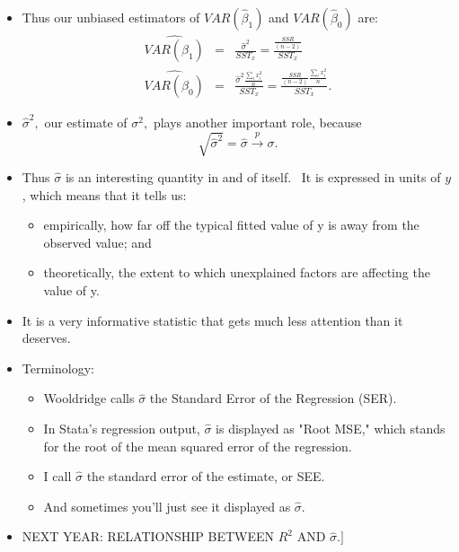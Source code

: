 \documentclass[11pt]{article}
\begin{document}
\begin{itemize}
\item Thus our unbiased estimators of $VAR\left( \widehat{\beta }_{1}\right) 
$ and $VAR\left( \widehat{\beta }_{0}\right) $ are:%
\begin{eqnarray*}
\widehat{VAR\left( \widehat{\beta }_{1}\right) } &=&\frac{\widehat{\sigma }%
^{2}}{SST_{x}}=\frac{\frac{SSR}{\left( n-2\right) }}{SST_{x}} \\
\widehat{VAR\left( \widehat{\beta }_{0}\right) } &=&\frac{\widehat{\sigma }%
^{2}\frac{\sum\nolimits_{i}x_{i}^{2}}{n}}{SST_{x}}=\frac{\frac{SSR}{\left(
n-2\right) }\frac{\sum\nolimits_{i}x_{i}^{2}}{n}}{SST_{x}}.
\end{eqnarray*}

\item $\widehat{\sigma }^{2},$ our estimate of $\sigma ^{2},$ plays another
important role, because 
\begin{equation*}
\sqrt{\widehat{\sigma }^{2}}=\widehat{\sigma }\overset{p}{\rightarrow }%
\sigma .
\end{equation*}

\item Thus $\widehat{\sigma }$ is an interesting quantity in and of itself.
\ It is expressed in units of $y$, which means that it tells us:

\begin{itemize}
\item empirically, how far off the typical fitted value of y is away from
the observed value; and

\item theoretically, the extent to which unexplained factors are affecting
the value of y. \ 
\end{itemize}

\item It is a very informative statistic that gets much less attention than
it deserves. \ 

\item Terminology:

\begin{itemize}
\item Wooldridge calls $\widehat{\sigma }$ the Standard Error of the
Regression (SER).

\item In Stata's regression output, $\widehat{\sigma }$ is displayed as
"Root MSE," which stands for the root of the mean squared error of the
regression. \ 

\item I call $\widehat{\sigma }$ the standard error of the estimate, or SEE.

\item And sometimes you'll just see it displayed as $\widehat{\sigma }.$
\end{itemize}

\item \lbrack NEXT YEAR: RELATIONSHIP BETWEEN $R^{2}$ AND $\widehat{\sigma }%
.]$
\end{itemize}
\end{document}
